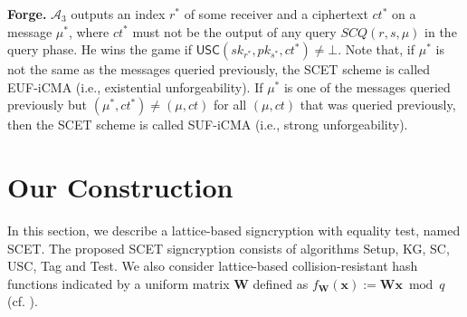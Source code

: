 \documentclass[a4paper,11pt,onecolumn]{elsarticle}
\begin{document}
		
		 \textbf{Forge.} $\mathcal{A}_3$  outputs an index $r^* $ of some receiver  and a ciphertext $ct^*$ on a message $\mu^*$, where $ct^*$  must not be the output of any query $ SCQ(r,s,\mu)$ in the query phase. He wins the game if $\mathsf{USC}(sk_{r^*},pk_{s^*},ct^*) \neq \bot$. 
		 Note that, if $\mu^*$ is not the same as the messages queried previously, the SCET scheme  is called EUF-iCMA (i.e., existential unforgeability). If $\mu^*$ is one of the messages queried previously but $(\mu^*, ct^*) \neq (\mu,ct)$ for all $(\mu,ct)$ that was queried previously, then the SCET scheme  is called SUF-iCMA (i.e., strong unforgeability). 
	
			
			
			
			
	
	
	\section{Our Construction} \label{lbscet}
	
	In this section, we describe a lattice-based signcryption with equality test, named \textsf{SCET}. The proposed \textsf{SCET}  signcryption consists of algorithms \textsf{Setup}, \textsf{KG}, \textsf{SC}, \textsf{USC}, \textsf{Tag} and \textsf{Test}.  We also consider  lattice-based collision-resistant hash functions  indicated  by  a uniform matrix $\textbf{W}$  defined as $f_{\textbf{W}}(\textbf{x}):=\textbf{W}\textbf{x} \bmod q$ (cf. \cite{MR07}).
	
\end{document}
